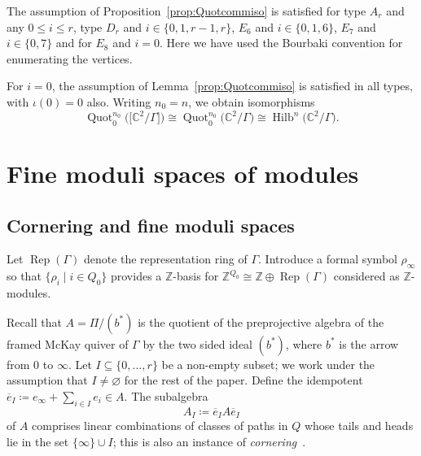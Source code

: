 \documentclass[10pt,a4paper]{amsart}
\newcommand{\SC}{\mathbb{C}} %
\newcommand{\Rep}{\operatorname{Rep}}
\newcommand{\PiQ}{A}
\DeclareMathOperator{\Hilb}{\mathrm{Hilb}}
\DeclareMathOperator{\Quot}{\mathrm{Quot}}
\numberwithin{equation}{section}
\begin{document}
\begin{Remark}
The assumption of Proposition~\ref{prop:Quotcommiso} is satisfied for type $A_r$ and any $0 \leq i \leq r$, type $D_r$ and $i \in \{0,1,r-1,r\}$, $E_6$ and $i \in \{0,1,6\}$, $E_7$ and $i \in \{0,7\}$ and for $E_8$ and $i=0$. Here we have used the Bourbaki convention \cite{BourbakiLie} for enumerating the vertices.
\end{Remark}

\begin{Example}
\label{rem:crsstck}
For $i=0$, the assumption of Lemma~\ref{prop:Quotcommiso} is satisfied in all types, with $\iota(0)=0$ also. Writing $n_0=n$, we obtain isomorphisms
\[ \Quot_0^{n_0}\big(\big[\SC^2/\Gamma\big]\big)\cong \Quot_0^{n_0}\big(\SC^2/\Gamma\big)\cong \Hilb^{n}\big(\SC^2/\Gamma\big). \]
\end{Example}

\section{Fine moduli spaces of modules}
\label{subsec:finemod}

\subsection{Cornering and fine moduli spaces}

Let $\Rep(\Gamma)$
denote the representation ring of $\Gamma$. Introduce a formal symbol $\rho_{\infty}$ so that $\{\rho_i \mid i \in Q_0\}$ provides a $\mathbb{Z}$-basis for $\mathbb{Z}^{Q_0}\cong \mathbb{Z}\oplus \Rep(\Gamma)$ considered as $\mathbb{Z}$-modules.

Recall that $\PiQ=\Pi/(b^{\ast})$ is the quotient of the
preprojective algebra of the framed McKay quiver of $\Gamma$ by the two sided ideal $(b^{\ast})$, where $b^\ast$ is the arrow from $0$ to $\infty$.
Let $I \subseteq \{0, \dots , r\}$ be a non-empty subset; we work under the assumption that $I\ne \varnothing$ for the rest of the paper.
Define the idempotent $\overline{e}_I \coloneqq e_{\infty} + \sum_{i \in I} e_i \in \PiQ$.
The subalgebra
\begin{equation}\label{eqn:AI}
\PiQ_I \coloneqq \overline{e}_I \PiQ \overline{e}_I
\end{equation}
of $A$ comprises linear combinations of
classes of paths in $Q$ whose tails and heads lie in the set $\{\infty\} \cup I$; this is also an instance of \emph{cornering}~\cite[Remark~3.1]{craw2018multigraded}.
\end{document}

